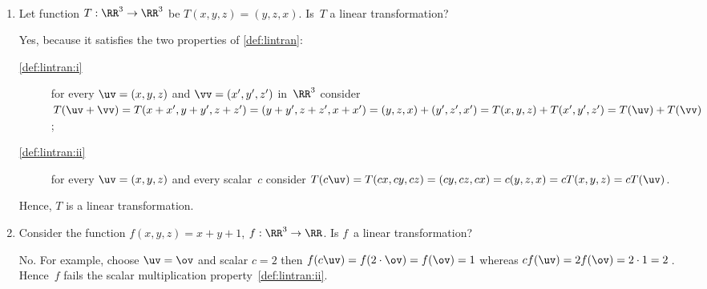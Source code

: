 \begin{example}\label{eg:ltHiD}\ 
\begin{enumerate}[ref=\ref{eg:ltHiD}(\alph*)]
\item Let function \(T:\RR^3\to\RR^3\) be \(T(x,y,z)=(y,z,x)\).  
Is~\(T\) a linear transformation?
\begin{solution} 
Yes, because it satisfies the two properties of \cref{def:lintran}:
\begin{description}
\item[\ref{def:lintran:i}] for every \(\uv=(x,y,z)\) and \(\vv=(x',y',z')\) in~\(\RR^3\) consider \(T(\uv+\vv)
=T(x+x',y+y',z+z')
=(y+y',z+z',x+x')
=(y,z,x)+(y',z',x')
=T(x,y,z)+T(x',y',z')
=T(\uv)+T(\vv)\);

\item[\ref{def:lintran:ii}] for every \(\uv=(x,y,z)\) and every scalar~\(c\)
consider \(T(c\uv)
=T(cx,cy,cz)
=(cy,cz,cx)
=c(y,z,x)
=cT(x,y,z)
=cT(\uv)\).
\end{description}
Hence, \(T\) is a linear transformation.
\end{solution}

\item Consider the function \(f(x,y,z)=x+y+1\), \(f:\RR^3\to\RR\). 
Is \(f\)~a linear transformation?
\begin{solution} 
No.  For example, choose \(\uv=\ov\) and scalar \(c=2\) then \(f(c\uv)=f(2\cdot\ov)=f(\ov)=1\) whereas \(cf(\uv)=2f(\ov)=2\cdot 1=2\)\,.
Hence~\(f\) fails the scalar multiplication property~\ref{def:lintran:ii}.
\end{solution}



\end{enumerate}
\end{example}
